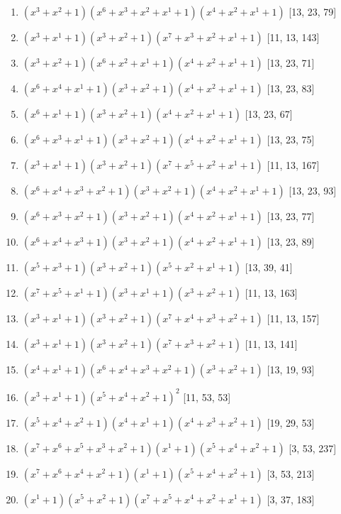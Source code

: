 \documentclass[10pt,twocolumn]{article}
\begin{document}
\begin{enumerate}
\item $(x^{3} + x^{2} + 1)(x^{6} + x^{3} + x^{2} + x^{1} + 1)(x^{4} + x^{2} + x^{1} + 1)$  [13, 23, 79]
\item $(x^{3} + x^{1} + 1)(x^{3} + x^{2} + 1)(x^{7} + x^{3} + x^{2} + x^{1} + 1)$  [11, 13, 143]
\item $(x^{3} + x^{2} + 1)(x^{6} + x^{2} + x^{1} + 1)(x^{4} + x^{2} + x^{1} + 1)$  [13, 23, 71]
\item $(x^{6} + x^{4} + x^{1} + 1)(x^{3} + x^{2} + 1)(x^{4} + x^{2} + x^{1} + 1)$  [13, 23, 83]
\item $(x^{6} + x^{1} + 1)(x^{3} + x^{2} + 1)(x^{4} + x^{2} + x^{1} + 1)$  [13, 23, 67]
\item $(x^{6} + x^{3} + x^{1} + 1)(x^{3} + x^{2} + 1)(x^{4} + x^{2} + x^{1} + 1)$  [13, 23, 75]
\item $(x^{3} + x^{1} + 1)(x^{3} + x^{2} + 1)(x^{7} + x^{5} + x^{2} + x^{1} + 1)$  [11, 13, 167]
\item $(x^{6} + x^{4} + x^{3} + x^{2} + 1)(x^{3} + x^{2} + 1)(x^{4} + x^{2} + x^{1} + 1)$  [13, 23, 93]
\item $(x^{6} + x^{3} + x^{2} + 1)(x^{3} + x^{2} + 1)(x^{4} + x^{2} + x^{1} + 1)$  [13, 23, 77]
\item $(x^{6} + x^{4} + x^{3} + 1)(x^{3} + x^{2} + 1)(x^{4} + x^{2} + x^{1} + 1)$  [13, 23, 89]
\item $(x^{5} + x^{3} + 1)(x^{3} + x^{2} + 1)(x^{5} + x^{2} + x^{1} + 1)$  [13, 39, 41]
\item $(x^{7} + x^{5} + x^{1} + 1)(x^{3} + x^{1} + 1)(x^{3} + x^{2} + 1)$  [11, 13, 163]
\item $(x^{3} + x^{1} + 1)(x^{3} + x^{2} + 1)(x^{7} + x^{4} + x^{3} + x^{2} + 1)$  [11, 13, 157]
\item $(x^{3} + x^{1} + 1)(x^{3} + x^{2} + 1)(x^{7} + x^{3} + x^{2} + 1)$  [11, 13, 141]
\item $(x^{4} + x^{1} + 1)(x^{6} + x^{4} + x^{3} + x^{2} + 1)(x^{3} + x^{2} + 1)$  [13, 19, 93]
\item $(x^{3} + x^{1} + 1)(x^{5} + x^{4} + x^{2} + 1)^{2}$  [11, 53, 53]
\item $(x^{5} + x^{4} + x^{2} + 1)(x^{4} + x^{1} + 1)(x^{4} + x^{3} + x^{2} + 1)$  [19, 29, 53]
\item $(x^{7} + x^{6} + x^{5} + x^{3} + x^{2} + 1)(x^{1} + 1)(x^{5} + x^{4} + x^{2} + 1)$  [3, 53, 237]
\item $(x^{7} + x^{6} + x^{4} + x^{2} + 1)(x^{1} + 1)(x^{5} + x^{4} + x^{2} + 1)$  [3, 53, 213]
\item $(x^{1} + 1)(x^{5} + x^{2} + 1)(x^{7} + x^{5} + x^{4} + x^{2} + x^{1} + 1)$  [3, 37, 183]

\end{enumerate}
\end{document}
